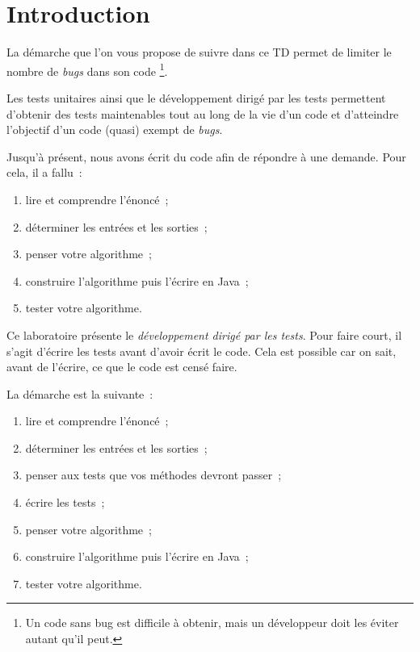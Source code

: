 \documentclass[a4paper,11pt]{style-esi/td}
\begin{document}

\section{Introduction}

La démarche que l'on vous propose de suivre dans ce TD permet de limiter %
le nombre de \textit{bugs} dans son code%
\footnote{%
	Un code sans bug est difficile à obtenir,
	mais un développeur doit les éviter autant qu'il peut.
}.

Les tests unitaires ainsi que le développement dirigé par les tests permettent
d'obtenir des tests maintenables tout au long de la vie d'un code et
d'atteindre l'objectif d'un code (quasi) exempt de \textit{bugs}.

Jusqu'à présent, nous avons écrit du code afin de répondre à une demande.
Pour cela, il a fallu~:
\begin{enumerate}
	\item lire et comprendre l'énoncé~;
	\item déterminer les entrées et les sorties~;
	\item penser votre algorithme~;
	\item construire l'algorithme puis l'écrire en Java~;
	\item tester votre algorithme.
\end{enumerate}

Ce laboratoire présente le \emph{développement dirigé par les tests}.
Pour faire court, il s'agit d'écrire les tests avant d'avoir écrit le code.
Cela est possible car on sait, avant de l'écrire, ce que le code est censé faire.

La démarche est la suivante~:
\begin{enumerate}
	\item lire et comprendre l'énoncé~;
	\item déterminer les entrées et les sorties~;
	\item penser aux tests que vos méthodes devront passer~;
	\item écrire les tests~;
	\item penser votre algorithme~;
	\item construire l'algorithme puis l'écrire en Java~;
	\item tester votre algorithme.
\end{enumerate}
\end{document}
